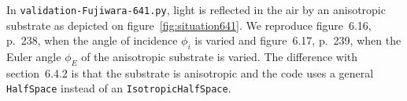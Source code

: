 In \verb/validation-Fujiwara-641.py/, light is reflected in the air by an anisotropic substrate as depicted on figure~\ref{fig:situation641}.
We reproduce figure~6.16, p.~238, when the angle of incidence $\phi_i$ is varied and figure~6.17, p.~239, when the Euler angle $\phi_E$ of the anisotropic substrate is varied.
The difference with section~6.4.2 is that the substrate is anisotropic and the code uses a general \verb/HalfSpace/ instead of an \verb/IsotropicHalfSpace/.



